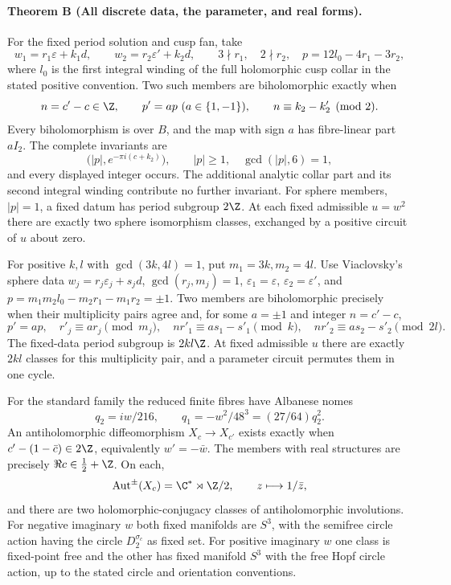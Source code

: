 \hypertarget{main-I-B}{}
\paragraph{Theorem B (All discrete data, the parameter, and real forms).}
\label{series:I:B}
For the fixed period solution and cusp fan, take
\[
 w_1=r_1\varepsilon+k_1d,\qquad
 w_2=r_2\varepsilon'+k_2d,\qquad
 3\nmid r_1,\quad2\nmid r_2,
 \quad p=12l_0-4r_1-3r_2,
\]
where $l_0$ is the first integral winding of the full holomorphic
cusp collar in the stated positive convention.  Two such members
are biholomorphic exactly when
\[
 n=c'-c\in\Z,\qquad p'=ap\ (a\in\{1,-1\}),\qquad
 n\equiv k_2-k'_2\pmod2.
\]
Every biholomorphism is over $B$, and the map with sign $a$ has
fibre-linear part $aI_2$.  The complete invariants are
\[
 \bigl(|p|,e^{-\pi i(c+k_2)}\bigr),\qquad
 |p|\ge1,\quad\gcd(|p|,6)=1,
\]
and every displayed integer occurs.  The additional analytic
collar part and its second integral winding contribute no further
invariant.  For sphere members, $|p|=1$, a fixed datum has period
subgroup $2\Z$.  At each fixed admissible $u=w^2$ there are
exactly two sphere isomorphism classes, exchanged by a positive
circuit of $u$ about zero.

For positive $k,l$ with $\gcd(3k,4l)=1$, put $m_1=3k,m_2=4l$.
Use Viaclovsky's sphere data
$w_j=r_j\varepsilon_j+s_jd$, $\gcd(r_j,m_j)=1$,
$\varepsilon_1=\varepsilon$, $\varepsilon_2=\varepsilon'$, and
$p=m_1m_2l_0-m_2r_1-m_1r_2=\pm1$.
Two members are biholomorphic precisely when their multiplicity
pairs agree and, for some $a=\pm1$ and integer $n=c'-c$,
\[
 p'=ap,\quad r'_j\equiv ar_j\pmod{m_j},\quad
 nr'_1\equiv as_1-s'_1\pmod{k},\quad
 nr'_2\equiv as_2-s'_2\pmod{2l}.
\]
The fixed-data period subgroup is $2kl\Z$.  At fixed admissible
$u$ there are exactly $2kl$ classes for this multiplicity pair,
and a parameter circuit permutes them in one cycle.

For the standard family the reduced finite fibres have Albanese
nomes
\[
 q_2=iw/216,\qquad q_1=-w^2/48^3=(27/64)q_2^2.
\]
An antiholomorphic diffeomorphism $X_c\to X_{c'}$ exists exactly
when $c'-(1-\bar c)\in2\Z$, equivalently $w'=-\bar w$.
The members with real structures are precisely
$\Re c\in\tfrac12+\Z$.  On each,
\[
 \operatorname{Aut}^{\pm}(X_c)=\C^*\rtimes\Z/2,
 \qquad z\longmapsto1/\bar z,
\]
and there are two holomorphic-conjugacy classes of antiholomorphic
involutions.  For negative imaginary $w$ both fixed manifolds
are $S^3$, with the semifree circle action having the circle
$D_2^{\sigma_c}$ as fixed set.  For positive imaginary $w$ one
class is fixed-point free and the other has fixed manifold $S^3$
with the free Hopf circle action, up to the stated circle and
orientation conventions.

